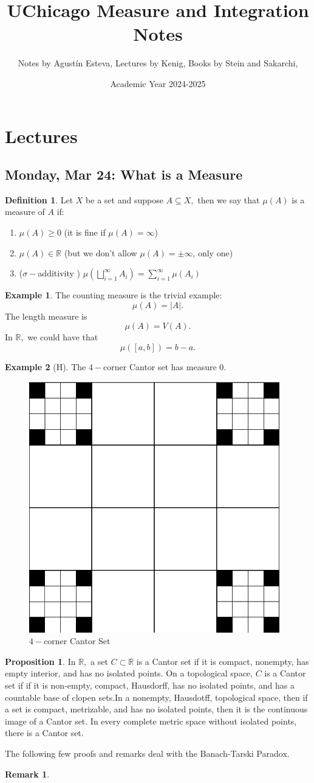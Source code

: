 \documentclass[10pt, oneside]{article}
\title{UChicago Measure and Integration Notes}
\author{Notes by Agustín Esteva, Lectures by Kenig, Books by Stein and Sakarchi, }
\date{Academic Year 2024-2025}
\newcommand{\bbR}{\mathbb{R}}
\theoremstyle{definition}
\newtheorem{exmp}{Example}[section]
\newtheorem{defn}{Definition}
\newtheorem{prop}{Proposition}
\newtheorem{rem}{Remark}
\begin{document}
\maketitle
\tableofcontents

\vspace{.25in}

\section{Lectures}

\subsection{Monday, Mar 24: What is a Measure}
\begin{defn}
    Let $X$ be a set and suppose $A\subseteq X,$ then we say that $\mu(A)$ is a measure of $A$ if:
    \begin{enumerate}
        \item $\mu(A) \geq 0$ (it is fine if $\mu (A) = \infty$) 
        \item $\mu(A) \in \bbR$ (but we don't allow $\mu(A) = \pm \infty$, only one)
        \item ($\sigma-$additivity ) $\mu(\bigsqcup_{i=1}^\infty A_i) = \sum_{i=1}^\infty\mu(A_i)$
    \end{enumerate}
\end{defn}
\begin{exmp}
    The counting measure is the trivial example:
    \[\mu(A) = |A|.\]
    The length measure is 
    \[\mu(A) = V(A).\]
    In $\bbR,$ we could have that 
    \[\mu([a,b]) = b-a.\]
\end{exmp}
\begin{exmp} [H]
    The $4-$corner Cantor set has measure $0.$
    \begin{figure}
        \centering
        \includegraphics[width=0.1\linewidth]{Images/4-corner Cantor.png}
        \caption{$4-$corner Cantor Set}
    \end{figure}
\end{exmp}
\begin{prop}
    In $\bbR,$ a set $C\subset \bbR$ is a Cantor set if it is compact, nonempty, has empty interior, and has no isolated points. On a topological space, $C$ is a Cantor set if if it is non-empty, compact, Hausdorff, has no isolated points, and has a countable base of clopen sets.In a nonempty, Hausdotff, topological space, then if a set is compact, metrizable, and has no isolated points, then it is the continuous image of a Cantor set. In every complete metric space without isolated points, there is a Cantor set.
\end{prop}

The following few proofs and remarks deal with the Banach-Tarski Paradox. 
\begin{rem}
    
\end{rem}
\end{document}
